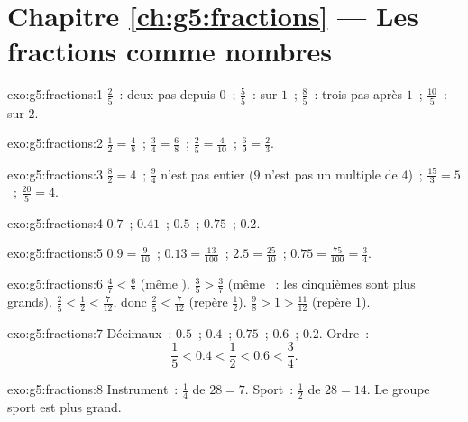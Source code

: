 \section*{Chapitre \ref{ch:g5:fractions} --- Les fractions comme nombres}

\begin{solution}{exo:g5:fractions:1}
$\frac25$~: deux pas depuis $0$~; $\frac55$~: sur $1$~;
$\frac85$~: trois pas après $1$~; $\frac{10}{5}$~: sur $2$.
\end{solution}

\begin{solution}{exo:g5:fractions:2}
$\frac12 = \frac48$~; \quad $\frac34 = \frac68$~; \quad
$\frac25 = \frac{4}{10}$~; \quad $\frac69 = \frac23$.
\end{solution}

\begin{solution}{exo:g5:fractions:3}
$\frac82 = 4$~; \quad $\frac94$ n'est pas entier ($9$ n'est pas un
multiple de $4$)~; \quad $\frac{15}{3} = 5$~; \quad
$\frac{20}{5} = 4$.
\end{solution}

\begin{solution}{exo:g5:fractions:4}
$0.7$~; \quad $0.41$~; \quad $0.5$~; \quad $0.75$~; \quad $0.2$.
\end{solution}

\begin{solution}{exo:g5:fractions:5}
$0.9 = \frac{9}{10}$~; \quad $0.13 = \frac{13}{100}$~; \quad
$2.5 = \frac{25}{10}$~; \quad $0.75 = \frac{75}{100} = \frac34$.
\end{solution}

\begin{solution}{exo:g5:fractions:6}
$\frac47 < \frac67$ (même ). \quad
$\frac35 > \frac37$ (même ~: les cinquièmes sont plus
grands). \quad
$\frac25 < \frac12 < \frac{7}{12}$, donc $\frac25 < \frac{7}{12}$
(repère $\frac12$). \quad
$\frac98 > 1 > \frac{11}{12}$ (repère $1$).
\end{solution}

\begin{solution}{exo:g5:fractions:7}
Décimaux~: $0.5$~; $0.4$~; $0.75$~; $0.6$~; $0.2$. Ordre~:
\[
\frac15 < 0.4 < \frac12 < 0.6 < \frac34 .
\]
\end{solution}

\begin{solution}{exo:g5:fractions:8}
Instrument~: $\frac14$ de $28 = 7$. Sport~: $\frac12$ de $28 = 14$.
Le groupe sport est plus grand.
\end{solution}

